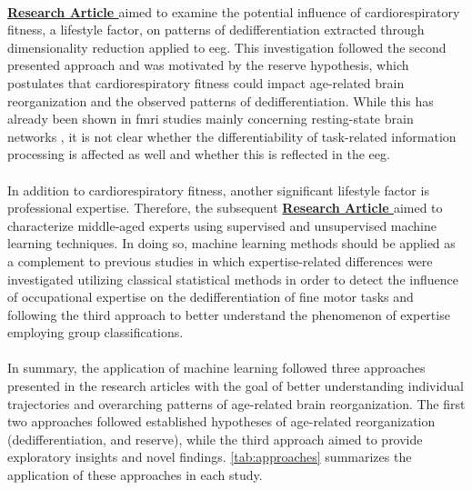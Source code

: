 \\
\textbf{\hyperref[pub:paperIII]{Research Article }} aimed to examine the potential influence of cardiorespiratory fitness, a lifestyle factor, on patterns of dedifferentiation extracted through dimensionality reduction applied to \gls{eeg}. This investigation followed the second presented approach and was motivated by the reserve hypothesis, which postulates that cardiorespiratory fitness could impact age-related brain reorganization and the observed patterns of dedifferentiation. While this has already been shown in \gls{fmri} studies mainly concerning resting-state brain networks \cite{Stillman2019}, it is not clear whether the differentiability of task-related information processing is affected as well and whether this is reflected in the \gls{eeg}.\\
\\
In addition to cardiorespiratory fitness, another significant lifestyle factor is professional expertise. Therefore, the subsequent \textbf{\hyperref[pub:paperIV]{Research Article }} aimed to characterize middle-aged experts using supervised and unsupervised machine learning techniques. In doing so, machine learning methods should be applied as a complement to previous studies in which expertise-related differences were investigated utilizing classical statistical methods \cite{vieluf2018age, Goelz2018} in order to detect the influence of occupational expertise on the dedifferentiation of fine motor tasks and following the third approach to better understand the phenomenon of expertise employing group classifications.\\
\\
In summary, the application of machine learning followed three approaches presented in the research articles with the goal of better understanding individual trajectories and overarching patterns of age-related brain reorganization. The first two approaches followed established hypotheses of age-related reorganization (dedifferentiation, and reserve), while the third approach aimed to provide exploratory insights and novel findings. \autoref{tab:approaches} summarizes the application of these approaches in each study.


